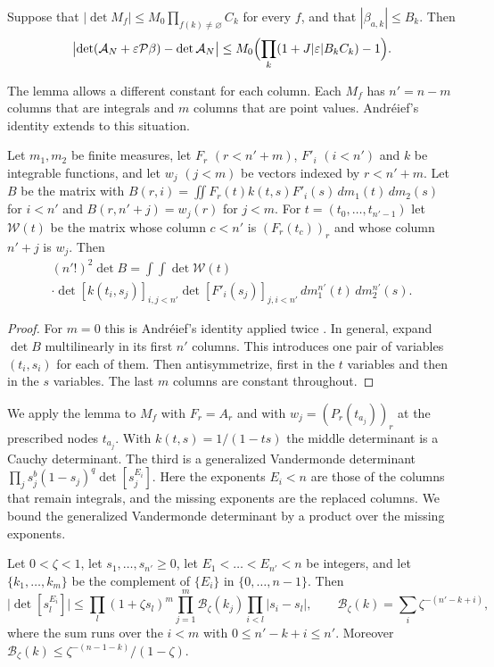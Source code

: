 \begin{lemma}\label{lem:expansion}
Suppose that $|\det M_f|\le M_0\prod_{f(k)\ne\varnothing}C_k$ for every $f$, and that $|\beta_{a,k}|\le B_k$.
Then
\[
 \bigl|\det(\mathcal A_N+\varepsilon\mathcal P\beta)-\det\mathcal A_N\bigr|\le M_0\Bigl(\prod_k(1+J|\varepsilon|B_kC_k)-1\Bigr).
\]
\end{lemma}

The lemma allows a different constant for each column. Each $M_f$ has $n'=n-m$ columns that are integrals
and $m$ columns that are point values. Andr\'eief's identity extends to this situation.

\begin{lemma}\label{lem:andreief}
Let $m_1,m_2$ be finite measures, let $F_r$ $(r<n'+m)$, $F'_i$ $(i<n')$ and $k$ be integrable functions, and let
$w_j$ $(j<m)$ be vectors indexed by $r<n'+m$. Let $B$ be the matrix with
$B(r,i)=\iint F_r(t)k(t,s)F'_i(s)\,dm_1(t)\,dm_2(s)$ for $i<n'$ and $B(r,n'+j)=w_j(r)$ for $j<m$. For
$t=(t_0,\ldots,t_{n'-1})$ let $\mathcal W(t)$ be the matrix whose column $c<n'$ is $(F_r(t_c))_r$ and whose column $n'+j$ is
$w_j$. Then
\begin{multline*}
 (n'!)^2\det B=\int\!\!\int\det\mathcal W(t)\\
 \cdot\det[k(t_i,s_j)]_{i,j<n'}\det[F'_i(s_j)]_{j,i<n'}\,dm_1^{n'}(t)\,dm_2^{n'}(s).
\end{multline*}
\end{lemma}

\begin{proof}
For $m=0$ this is Andr\'eief's identity applied twice \cite{Forrester2018Andreief}. In general, expand
$\det B$ multilinearly in its first $n'$ columns. This introduces one pair of variables $(t_i,s_i)$ for each
of them. Then antisymmetrize, first in the $t$ variables and then in the $s$ variables. The last $m$ columns
are constant throughout.
\end{proof}

We apply the lemma to $M_f$ with $F_r=A_r$ and with $w_j=(P_r(t_{a_j}))_r$ at the prescribed nodes $t_{a_j}$.
With $k(t,s)=1/(1-ts)$ the middle determinant is a Cauchy determinant. The third is a generalized
Vandermonde determinant $\prod_js_j^b(1-s_j)^q\det[s_j^{E_i}]$. Here the exponents $E_i<n$ are those of the
columns that remain integrals, and the missing exponents are the replaced columns. We bound the generalized
Vandermonde determinant by a product over the missing exponents.

\begin{lemma}\label{lem:binomvand}
Let $0<\zeta<1$, let $s_1,\ldots,s_{n'}\ge0$, let $E_1<\dots<E_{n'}<n$ be integers, and let $\{k_1,\ldots,k_m\}$ be
the complement of $\{E_i\}$ in $\{0,\ldots,n-1\}$. Then
\[
 \bigl|\det[s_l^{E_i}]\bigr|\le\prod_l(1+\zeta s_l)^m\prod_{j=1}^m\mathcal B_\zeta(k_j)\prod_{i<l}|s_i-s_l|,\qquad
 \mathcal B_\zeta(k)=\sum_{i}\zeta^{-(n'-k+i)},
\]
where the sum runs over the $i<m$ with $0\le n'-k+i\le n'$. Moreover $\mathcal B_\zeta(k)\le\zeta^{-(n-1-k)}/(1-\zeta)$.
\end{lemma}


